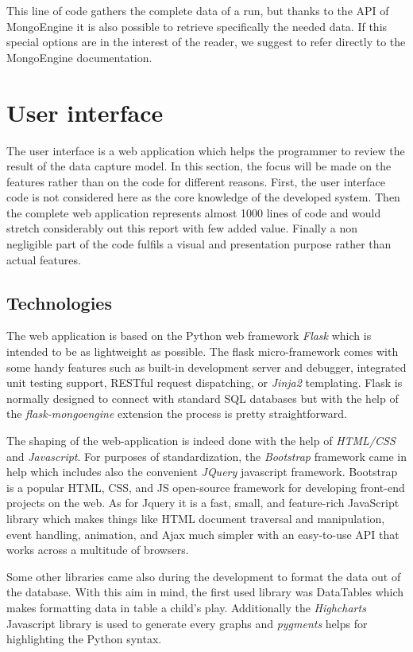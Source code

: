 This line of code gathers the complete data of a run, but thanks to the API of MongoEngine it is also possible to retrieve specifically the needed data. If this special options are in the interest of the reader, we suggest to refer directly to the MongoEngine documentation.

\section{User interface}
The user interface is a web application which helps the programmer to review the result of the data capture model. In this section, the focus will be made on the features rather than on the code for different reasons. First, the user interface code is not considered here as the core knowledge of the developed system. Then the complete web application represents almost 1000 lines of code and would stretch considerably out this report with few added value. Finally a non negligible part of the code fulfils a visual and presentation purpose rather than actual features.

\subsection{Technologies}
The web application is based on the Python web framework \textit{Flask} which is intended to be as lightweight as possible. The flask micro-framework comes with some handy features such as built-in development server and debugger, integrated unit testing support, RESTful request dispatching, or \textit{Jinja2} templating. Flask is normally designed to connect with standard SQL databases but with the help of the \textit{flask-mongoengine} extension the process is pretty straightforward.

The shaping of the web-application is indeed done with the help of \textit{HTML/CSS} and \textit{Javascript}. For purposes of standardization, the \textit{Bootstrap} framework came in help which includes also the convenient \textit{JQuery} javascript framework. Bootstrap is a popular HTML, CSS, and JS open-source framework for developing front-end projects on the web. As for Jquery it is a fast, small, and feature-rich JavaScript library which makes things like HTML document traversal and manipulation, event handling, animation, and Ajax much simpler with an easy-to-use API that works across a multitude of browsers.

Some other libraries came also during the development to format the data out of the database. With this aim in mind, the first used library was DataTables which makes formatting data in table a child's play. Additionally the \textit{Highcharts} Javascript library is used to generate every graphs and \textit{pygments} helps for highlighting the Python syntax.

